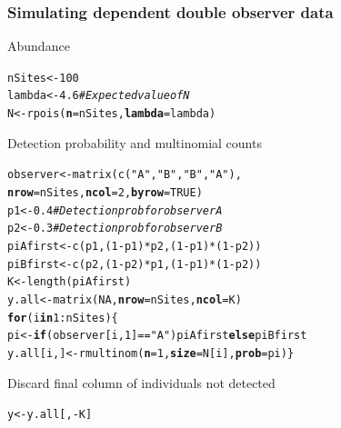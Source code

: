 \documentclass[color=usenames,dvipsnames]{beamer}\usepackage[]{graphicx}\usepackage[]{xcolor}
\makeatletter
\newcommand{\hlnum}[1]{\textcolor[rgb]{0.69,0.494,0}{#1}}%
\newcommand{\hlsng}[1]{\textcolor[rgb]{0.749,0.012,0.012}{#1}}%
\newcommand{\hlcom}[1]{\textcolor[rgb]{0.514,0.506,0.514}{\textit{#1}}}%
\newcommand{\hlopt}[1]{\textcolor[rgb]{0,0,0}{#1}}%
\newcommand{\hldef}[1]{\textcolor[rgb]{0,0,0}{#1}}%
\newcommand{\hlkwa}[1]{\textcolor[rgb]{0,0,0}{\textbf{#1}}}%
\newcommand{\hlkwb}[1]{\textcolor[rgb]{0,0.341,0.682}{#1}}%
\newcommand{\hlkwc}[1]{\textcolor[rgb]{0,0,0}{\textbf{#1}}}%
\newcommand{\hlkwd}[1]{\textcolor[rgb]{0.004,0.004,0.506}{#1}}%
\newenvironment{kframe}{%
 \def\at@end@of@kframe{}%
 \ifinner\ifhmode%
  \def\at@end@of@kframe{\end{minipage}}%
  \begin{minipage}{\columnwidth}%
 \fi\fi%
 \def\FrameCommand##1{\hskip\@totalleftmargin \hskip-\fboxsep
 \colorbox{shadecolor}{##1}\hskip-\fboxsep
     \hskip-\linewidth \hskip-\@totalleftmargin \hskip\columnwidth}%
 \MakeFramed {\advance\hsize-\width
   \@totalleftmargin\z@ \linewidth\hsize
   \@setminipage}}%
 {\par\unskip\endMakeFramed%
 \at@end@of@kframe}
\newenvironment{knitrout}{}{} %
\makeatother
\begin{document}
\begin{frame}[fragile]
  \frametitle{Simulating dependent double observer data}
  \small
  Abundance
\begin{knitrout}\scriptsize
{}\color{fgcolor}\begin{kframe}
\begin{alltt}
\hldef{nSites} \hlkwb{<-} \hlnum{100}
\hldef{lambda} \hlkwb{<-} \hlnum{4.6}  \hlcom{# Expected value of N}
\hldef{N} \hlkwb{<-} \hlkwd{rpois}\hldef{(}\hlkwc{n}\hldef{=nSites,} \hlkwc{lambda}\hldef{=lambda)}
\end{alltt}
\end{kframe}
\end{knitrout}
  \pause
  \vfill
  Detection probability and multinomial counts
\begin{knitrout}\scriptsize
{}\color{fgcolor}\begin{kframe}
\begin{alltt}
\hldef{observer} \hlkwb{<-} \hlkwd{matrix}\hldef{(}\hlkwd{c}\hldef{(}\hlsng{"A"}\hldef{,}\hlsng{"B"}\hldef{,}\hlsng{"B"}\hldef{,}\hlsng{"A"}\hldef{),}
                   \hlkwc{nrow}\hldef{=nSites,} \hlkwc{ncol}\hldef{=}\hlnum{2}\hldef{,} \hlkwc{byrow}\hldef{=}\hlnum{TRUE}\hldef{)}
\hldef{p1} \hlkwb{<-} \hlnum{0.4}  \hlcom{# Detection prob for observer A}
\hldef{p2} \hlkwb{<-} \hlnum{0.3}  \hlcom{# Detection prob for observer B}
\hldef{piAfirst} \hlkwb{<-} \hlkwd{c}\hldef{(p1, (}\hlnum{1}\hlopt{-}\hldef{p1)}\hlopt{*}\hldef{p2, (}\hlnum{1}\hlopt{-}\hldef{p1)}\hlopt{*}\hldef{(}\hlnum{1}\hlopt{-}\hldef{p2))}
\hldef{piBfirst} \hlkwb{<-} \hlkwd{c}\hldef{(p2, (}\hlnum{1}\hlopt{-}\hldef{p2)}\hlopt{*}\hldef{p1, (}\hlnum{1}\hlopt{-}\hldef{p1)}\hlopt{*}\hldef{(}\hlnum{1}\hlopt{-}\hldef{p2))}
\hldef{K} \hlkwb{<-} \hlkwd{length}\hldef{(piAfirst)}
\hldef{y.all} \hlkwb{<-} \hlkwd{matrix}\hldef{(}\hlnum{NA}\hldef{,} \hlkwc{nrow}\hldef{=nSites,} \hlkwc{ncol}\hldef{=K)}
\hlkwa{for}\hldef{(i} \hlkwa{in} \hlnum{1}\hlopt{:}\hldef{nSites) \{}
  \hldef{pi} \hlkwb{<-} \hlkwa{if}\hldef{(observer[i,}\hlnum{1}\hldef{]}\hlopt{==}\hlsng{"A"}\hldef{) piAfirst} \hlkwa{else} \hldef{piBfirst}
  \hldef{y.all[i,]} \hlkwb{<-} \hlkwd{rmultinom}\hldef{(}\hlkwc{n}\hldef{=}\hlnum{1}\hldef{,} \hlkwc{size}\hldef{=N[i],} \hlkwc{prob}\hldef{=pi)    \}}
\end{alltt}
\end{kframe}
\end{knitrout}
  \pause
  \vfill
  Discard final column of individuals not detected
\begin{knitrout}\scriptsize
{}\color{fgcolor}\begin{kframe}
\begin{alltt}
\hldef{y} \hlkwb{<-} \hldef{y.all[,}\hlopt{-}\hldef{K]}
\end{alltt}
\end{kframe}
\end{knitrout}
\end{frame}
\end{document}
